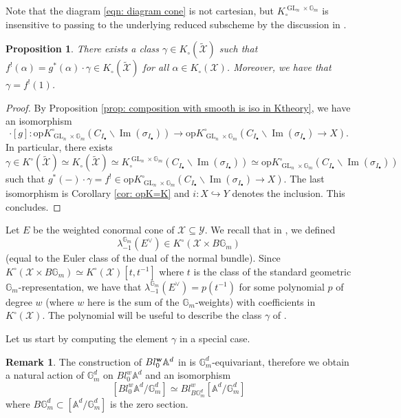 \documentclass[12pt]{amsart}
\newcommand\G{\mathbb{G}}
\newcommand\Gm{\mathbb{G}_m}
\newcommand\A{\mathbb{A}}
\newcommand{\bA}{\mathbb{A}}
\newcommand{\cX}{\mathcal{X}}
\newcommand{\cY}{\mathcal{Y}}
\newcommand{\GL}{\operatorname{GL}}
\newcommand{\Kring}{K^{\circ}}
\newcommand{\Kgroup}{K_{\circ}}
\newcommand{\opK}{\mathrm{op}K^{\circ}}
\newtheorem{Prop}[theorem]{Proposition}
\theoremstyle{definition}
\newtheorem{Rmk}[theorem]{Remark}
\begin{document}
Note that the diagram \eqref{eqn: diagram cone} is not cartesian, but $\Kgroup^{\GL_n \times \Gm}$ is insensitive to passing to the underlying reduced subscheme by the discussion in .

\begin{Prop}\label{prop:existence of gamma}
    There exists a class $\gamma \in \Kgroup(\widetilde{\cX})$ such that $f^!(\alpha)= g^*(\alpha) \cdot \gamma \in \Kgroup(\widetilde{\cX})$ for all $\alpha \in \Kgroup(\cX)$. Moreover, we have that $\gamma=f^{!}(1)$.
\end{Prop}
\begin{proof}
    By Proposition \ref{prop: composition with smooth is iso in Ktheory}, we have an isomorphism 
    $$
    \cdot [g] \colon \opK_{\GL_n \times \Gm}(C_{I_{\bullet}} \smallsetminus \operatorname{Im}(\sigma_{I_{\bullet}})) \longrightarrow \opK_{\GL_n \times \Gm}(C_{I_{\bullet}} \smallsetminus \operatorname{Im}(\sigma_{I_{\bullet}}) \to X).
    $$
    In particular, there exists
    $$
    \gamma \in \Kring(\widetilde{\cX}) \simeq \Kgroup(\widetilde{\cX}) \simeq \Kgroup^{\GL_n \times \Gm}( C_{I_{\bullet}} \smallsetminus \operatorname{Im}(\sigma_{I_{\bullet}})) \simeq \opK_{\GL_n \times \Gm}(C_{I_{\bullet}} \smallsetminus \operatorname{Im}(\sigma_{I_{\bullet}}))
    $$
    such that $g^*(-) \cdot \gamma= f^! \in \opK_{\GL_n \times \Gm}(C_{I_{\bullet}} \smallsetminus \operatorname{Im}(\sigma_{I_{\bullet}}) \to X)$. The last isomorphism is Corollary \ref{cor: opK=K} and $i : X \hookrightarrow Y$ denotes the inclusion. This concludes.
\end{proof}

Let $E$ be the weighted conormal cone of $\cX \subseteq \cY$. We recall that in , we defined
$$ \lambda^{\Gm}_{-1}(E^{\vee}) \in \Kring(\cX \times B\Gm)$$
(equal to the Euler class of the dual of the normal bundle). Since $\Kring(\cX \times B\Gm)\simeq \Kring(\cX)[t,t^{-1}]$ where $t$ is the {class of the} standard geometric $\Gm$-representation, we have that $ \lambda^{\Gm}_{-1}(E^{\vee}) = p(t^{-1})$ for some polynomial $p$ of degree $w$ (where $w$ here is the sum of the $\Gm$-weights)  with coefficients in $\Kring(\cX)$. The polynomial will be useful to describe the class $\gamma$ of .

Let us start by computing the element $\gamma$ in a special case.

\begin{Rmk}
    The construction of $Bl_0^{\bf{w}} \bA^d$ in  is $\G_m^d$-equivariant, therefore we obtain a natural action of $\Gm^d$ on $Bl_{0}^{w}\A^d$ and an isomorphism 
    $$ [Bl_{0}^w\A^d/\Gm^d] \simeq Bl_{B\G_m^d}^w[\A^d/\G_m^d]$$
    where $B\G_m^d\subset [\A^d/\G_m^d]$ is the zero section.
\end{Rmk}
\end{document}
